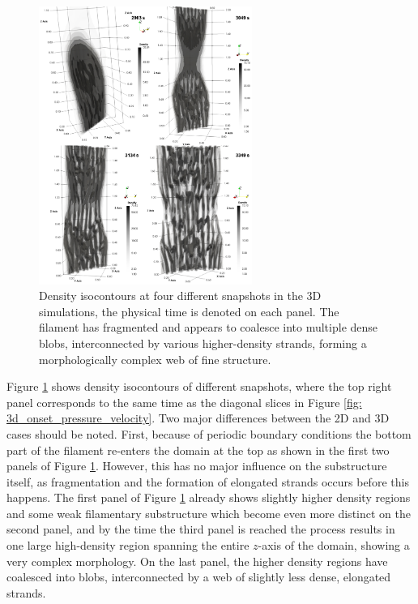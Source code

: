 \begin{figure}[b!]
  \centering
  \includegraphics[width=0.62\textwidth]{3d_density_evolution.png}
  \caption{
    Density isocontours at four different snapshots in the 3D simulations, the physical time is denoted on each panel. The filament has fragmented and appears to coalesce into multiple dense blobs, interconnected by various higher-density strands, forming a morphologically complex web of fine structure.
  }
  \label{fig: 3d_density_evolution}
\end{figure}

Figure \ref{fig: 3d_density_evolution} shows density isocontours of different snapshots, where the top right panel corresponds to the same time as the diagonal slices in Figure \ref{fig: 3d_onset_pressure_velocity}. Two major differences between the 2D and 3D cases should be noted. First, because of periodic boundary conditions the bottom part of the filament re-enters the domain at the top as shown in the first two panels of Figure \ref{fig: 3d_density_evolution}. However, this has no major influence on the substructure itself, as fragmentation and the formation of elongated strands occurs before this happens. The first panel of Figure \ref{fig: 3d_density_evolution} already shows slightly higher density regions and some weak filamentary substructure which become even more distinct on the second panel, and by the time the third panel is reached the process results in one large high-density region spanning the entire $z$-axis of the domain, showing a very complex morphology. On the last panel, the higher density regions have coalesced into blobs, interconnected by a web of slightly less dense, elongated strands.

